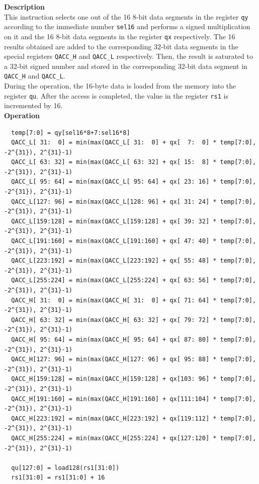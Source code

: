 \textbf{Description}\\
This instruction selects one out of the 16 8-bit data segments in the register \lstinline{qy} according to the immediate number \lstinline{sel16} and performs a signed multiplication on it and the 16 8-bit data segments in the register \lstinline{qx} respectively. The 16 results obtained are added to the corresponding 32-bit data segments in the special registers \lstinline{QACC_H} and \lstinline{QACC_L} respectively. Then, the result is saturated to a 32-bit signed number and stored in the corresponding 32-bit data segment in \lstinline{QACC_H} and \lstinline{QACC_L}.\\
During the operation, the 16-byte data is loaded from the memory into the register \lstinline{qu}. After the access is completed, the value in the register \lstinline{rs1} is incremented by 16.\\
\textbf{Operation}
\begin{lstlisting}
  temp[7:0] = qy[sel16*8+7:sel16*8]
  QACC_L[ 31:  0] = min(max(QACC_L[ 31:  0] + qx[  7:  0] * temp[7:0], -2^{31}), 2^{31}-1)
  QACC_L[ 63: 32] = min(max(QACC_L[ 63: 32] + qx[ 15:  8] * temp[7:0], -2^{31}), 2^{31}-1)
  QACC_L[ 95: 64] = min(max(QACC_L[ 95: 64] + qx[ 23: 16] * temp[7:0], -2^{31}), 2^{31}-1)
  QACC_L[127: 96] = min(max(QACC_L[128: 96] + qx[ 31: 24] * temp[7:0], -2^{31}), 2^{31}-1)
  QACC_L[159:128] = min(max(QACC_L[159:128] + qx[ 39: 32] * temp[7:0], -2^{31}), 2^{31}-1)
  QACC_L[191:160] = min(max(QACC_L[191:160] + qx[ 47: 40] * temp[7:0], -2^{31}), 2^{31}-1)
  QACC_L[223:192] = min(max(QACC_L[223:192] + qx[ 55: 48] * temp[7:0], -2^{31}), 2^{31}-1)
  QACC_L[255:224] = min(max(QACC_L[255:224] + qx[ 63: 56] * temp[7:0], -2^{31}), 2^{31}-1)
  QACC_H[ 31:  0] = min(max(QACC_H[ 31:  0] + qx[ 71: 64] * temp[7:0], -2^{31}), 2^{31}-1)
  QACC_H[ 63: 32] = min(max(QACC_H[ 63: 32] + qx[ 79: 72] * temp[7:0], -2^{31}), 2^{31}-1)
  QACC_H[ 95: 64] = min(max(QACC_H[ 95: 64] + qx[ 87: 80] * temp[7:0], -2^{31}), 2^{31}-1)
  QACC_H[127: 96] = min(max(QACC_H[127: 96] + qx[ 95: 88] * temp[7:0], -2^{31}), 2^{31}-1)
  QACC_H[159:128] = min(max(QACC_H[159:128] + qx[103: 96] * temp[7:0], -2^{31}), 2^{31}-1)
  QACC_H[191:160] = min(max(QACC_H[191:160] + qx[111:104] * temp[7:0], -2^{31}), 2^{31}-1)
  QACC_H[223:192] = min(max(QACC_H[223:192] + qx[119:112] * temp[7:0], -2^{31}), 2^{31}-1)
  QACC_H[255:224] = min(max(QACC_H[255:224] + qx[127:120] * temp[7:0], -2^{31}), 2^{31}-1)

  qu[127:0] = load128(rs1[31:0])
  rs1[31:0] = rs1[31:0] + 16
\end{lstlisting}

